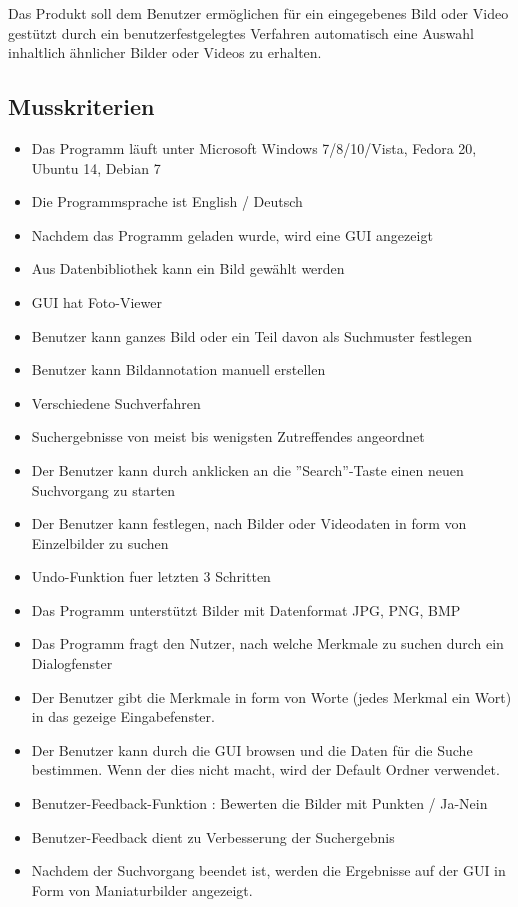 Das Produkt soll dem Benutzer ermöglichen für ein eingegebenes Bild oder Video gestützt durch ein benutzerfestgelegtes Verfahren automatisch eine Auswahl inhaltlich ähnlicher Bilder oder Videos zu erhalten.
\subsection{Musskriterien}
\begin{itemize}
\item Das Programm läuft unter Microsoft Windows 7/8/10/Vista, Fedora 20, Ubuntu 14, Debian 7
\item Die Programmsprache ist English / Deutsch 
\item Nachdem das Programm geladen wurde, wird eine GUI angezeigt
\item Aus Datenbibliothek kann ein Bild gewählt werden
\item GUI hat Foto-Viewer
\item Benutzer kann ganzes Bild oder ein Teil davon als Suchmuster festlegen
\item Benutzer kann Bildannotation manuell erstellen
\item Verschiedene Suchverfahren
\item Suchergebnisse von meist bis wenigsten Zutreffendes angeordnet
\item Der Benutzer kann durch anklicken an die ''Search''-Taste einen neuen Suchvorgang zu starten
\item Der Benutzer kann festlegen, nach Bilder oder Videodaten in form von Einzelbilder zu suchen
\item Undo-Funktion fuer letzten 3 Schritten
\item Das Programm unterstützt Bilder mit Datenformat JPG, PNG, BMP
\item Das Programm fragt den Nutzer, nach welche Merkmale zu suchen durch ein Dialogfenster
\item Der Benutzer gibt die Merkmale in form von Worte (jedes Merkmal ein Wort) in das gezeige Eingabefenster.
\item Der Benutzer kann durch die GUI browsen und die Daten für die Suche bestimmen. Wenn der dies nicht macht, wird der Default  Ordner verwendet.
\item Benutzer-Feedback-Funktion : Bewerten die Bilder mit Punkten / Ja-Nein
\item Benutzer-Feedback dient zu Verbesserung der Suchergebnis
\item Nachdem der Suchvorgang beendet ist, werden die Ergebnisse auf der GUI in Form von Maniaturbilder angezeigt. 

\end{itemize}
